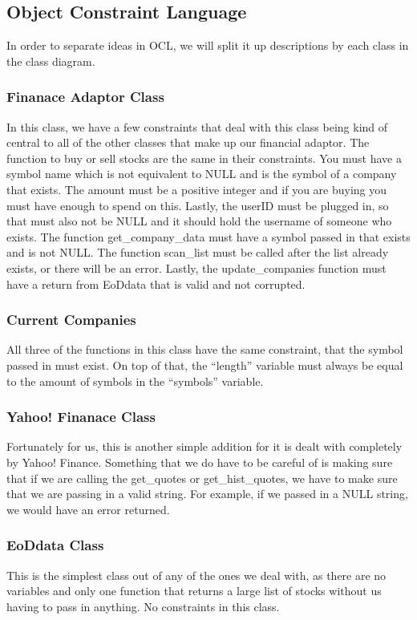 \subsection{Object Constraint Language}
In order to separate ideas in OCL, we will split it up descriptions by each class in the class diagram.
\subsubsection{Finanace Adaptor Class}
In this class, we have a few constraints that deal with this class being kind of central to all of the other classes that make up our financial adaptor. The function to buy or sell stocks are the same in their constraints. You must have a symbol name which is not equivalent to NULL and is the symbol of a company that exists. The amount must be a positive integer and if you are buying you must have enough to spend on this. Lastly, the userID must be plugged in, so that must also not be NULL and it should hold the username of someone who exists. The function get\_company\_data must have a symbol passed in that exists and is not NULL. The function scan\_list must be called after the list already exists, or there will be an error. Lastly, the update\_companies function must have a return from EoDdata that is valid and not corrupted.
\subsubsection{Current Companies}
All three of the functions in this class have the same constraint, that the symbol passed in must exist. On top of that, the ``length'' variable must always be equal to the amount of symbols in the ``symbols'' variable.
\subsubsection{Yahoo! Finanace Class}
Fortunately for us, this is another simple addition for it is dealt with completely by Yahoo! Finance. Something that we do have to be careful of is making sure that if we are calling the get\_quotes or get\_hist\_quotes, we have to make sure that we are passing in a valid string. For example, if we passed in a NULL string, we would have an error returned.
\subsubsection{EoDdata Class}
This is the simplest class out of any of the ones we deal with, as there are no variables and only one function that returns a large list of stocks without us having to pass in anything. No constraints in this class.
